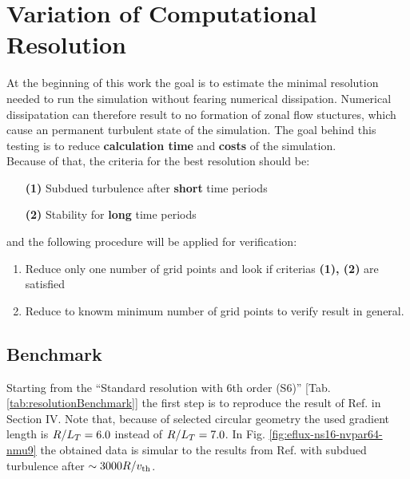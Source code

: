 \section{Variation of Computational Resolution}
\label{sec:variationsofresolution}

At the beginning of this work the goal is to estimate the minimal resolution needed to run the simulation without fearing numerical dissipation. Numerical dissipatation can therefore result to no formation of zonal flow stuctures, which cause an permanent turbulent state of the simulation. The goal behind this testing is to reduce \textbf{calculation time} and \textbf{costs} of the simulation. \\
Because of that, the criteria for the best resolution should be:
\begin{enumerate}
	\item[\textbf{(1)}] Subdued turbulence after \textbf{short} time periods
	\item[\textbf{(2)}] Stability for \textbf{long} time periods 
\end{enumerate}
and the following procedure will be applied for verification:
\begin{enumerate}
	\item Reduce only one number of grid points and look if criterias \textbf{(1), (2)} are satisfied
	\item Reduce to knowm minimum number of grid points to verify result in general.
\end{enumerate}


\subsection{Benchmark}
\label{sub:benchmark}

Starting from the \enquote{Standard resolution with 6th order (S6)} [Tab. \ref{tab:resolutionBenchmark}] the first step is to reproduce the result of Ref.  in Section IV. Note that, because of selected circular geometry the used gradient length is $R/L_T = 6.0$ instead of $R/L_T = 7.0$. In Fig. \ref{fig:eflux-ns16-nvpar64-nmu9} the obtained data is simular to the results from Ref.  with subdued turbulence after $\sim 3000 R/v_{\mathrm{th}}$. 


